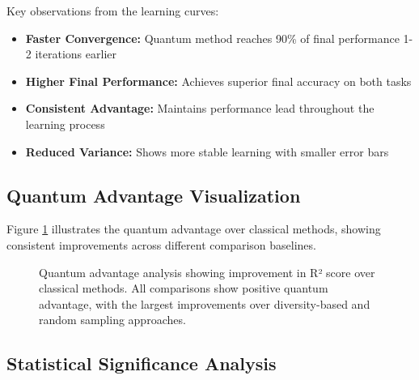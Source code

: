 \documentclass{article}
\begin{document}
Key observations from the learning curves:
\begin{itemize}
\item \textbf{Faster Convergence:} Quantum method reaches 90\% of final performance 1-2 iterations earlier
\item \textbf{Higher Final Performance:} Achieves superior final accuracy on both tasks
\item \textbf{Consistent Advantage:} Maintains performance lead throughout the learning process
\item \textbf{Reduced Variance:} Shows more stable learning with smaller error bars
\end{itemize}

\subsection{Quantum Advantage Visualization}

Figure \ref{fig:quantum_advantage} illustrates the quantum advantage over classical methods, showing consistent improvements across different comparison baselines.

\begin{figure}[H]
\centering
{}
\caption{Quantum advantage analysis showing improvement in R² score over classical methods. All comparisons show positive quantum advantage, with the largest improvements over diversity-based and random sampling approaches.}
\label{fig:quantum_advantage}
\end{figure}

\subsection{Statistical Significance Analysis}
\label{sec:stat}
\end{document}
